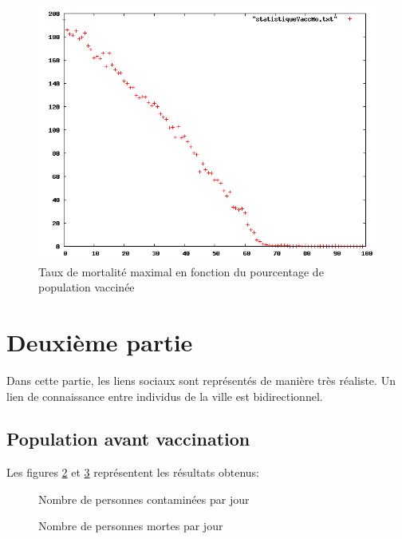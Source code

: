 \documentclass[12pt,a4paper,titlepage]{report}
\begin{document}
 \begin{figure}[h]
  \centering
  \includegraphics[width=15cm]{1-2-statistiqueMo.png}
  \caption{Taux de mortalité maximal en fonction du pourcentage de population vaccinée}
  \label{fig:1-2-nb-morts}
\end{figure}



%

\section*{Deuxième partie}
Dans cette partie, les liens sociaux sont représentés de manière très réaliste. Un lien de 
connaissance entre individus de la ville est bidirectionnel.  
\subsection*{Population avant vaccination}
Les figures \ref{fig:2-1-nb-malades} et \ref{fig:2-1-nb-morts} représentent les résultats obtenus:
\begin{figure}[h]
  \centering
  \caption{Nombre de personnes contaminées par jour}
  \label{fig:2-1-nb-malades}
\end{figure}

\begin{figure}[h]
  \centering
  \caption{Nombre de personnes mortes par jour}
  \label{fig:2-1-nb-morts}
\end{figure}
\end{document}
